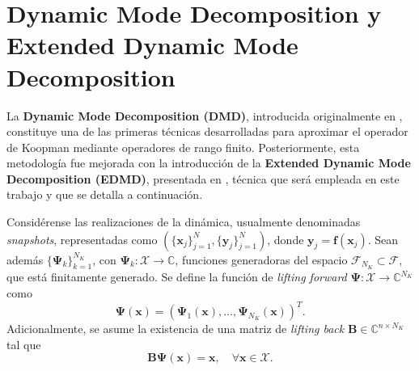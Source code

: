 \section{Dynamic Mode Decomposition y Extended Dynamic Mode Decomposition}

La \textbf{Dynamic Mode Decomposition (DMD)}, introducida originalmente en \cite{Schmid2008DynamicData}, constituye una de las primeras técnicas desarrolladas para aproximar el operador de Koopman mediante operadores de rango finito. Posteriormente, esta metodología fue mejorada con la introducción de la \textbf{Extended Dynamic Mode Decomposition (EDMD)}, presentada en \cite{Williams2015ADecomposition}, técnica que será empleada en este trabajo y que se detalla a continuación.

Considérense las realizaciones de la dinámica, usualmente denominadas \textit{snapshots}, representadas como $(\{\mathbf{x}_j\}_{j=1}^N, \{\mathbf{y}_j\}_{j=1}^N)$, donde $\mathbf{y}_j = \mathbf{f}(\mathbf{x}_j)$. Sean además $\{\mathbf{\Psi}_k\}_{k=1}^{N_K}$, con $\mathbf{\Psi}_k: \mathcal{X} \to \mathbb{C}$, funciones generadoras del espacio $\mathcal{F}_{N_K} \subset \mathcal{F}$, que está finitamente generado. Se define la función de \textit{lifting forward} $\mathbf{\Psi}: \mathcal{X} \to \mathbb{C}^{N_K}$ como  
\[
\mathbf{\Psi}(\mathbf{x}) = (\mathbf{\Psi}_1(\mathbf{x}), \dots, \mathbf{\Psi}_{N_K}(\mathbf{x}))^T.
\]
Adicionalmente, se asume la existencia de una matriz de \textit{lifting back} $\mathbf{B} \in \mathbb{C}^{n \times N_K}$ tal que  
\[
\mathbf{B} \mathbf{\Psi}(\mathbf{x}) = \mathbf{x}, \quad \forall \mathbf{x} \in \mathcal{X}.
\]

